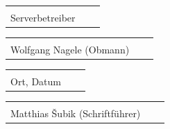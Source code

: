 \documentclass[parskip=half]{scrreprt}
\begin{document}
\vspace{0.5 cm}
\begin{tabular}{p{7cm}p{.5cm}l}
\dotfill \\
Serverbetreiber
\end{tabular}
\hfill
\begin{tabular}{p{7cm}p{.5cm}l}
\dotfill \\
Wolfgang Nagele (Obmann)
\end{tabular}

\vspace{0.5cm}
\begin{tabular}{p{7cm}p{.5cm}l}
\dotfill \\
Ort, Datum
\end{tabular}
\hfill
\begin{tabular}{p{7cm}p{.5cm}l}
\dotfill \\
Matthias Šubik (Schriftführer)
\end{tabular}


\end{document}
